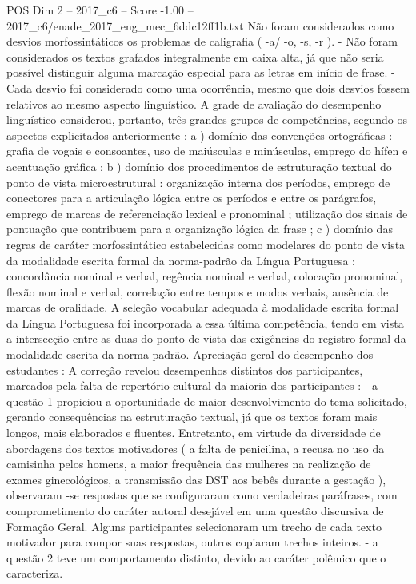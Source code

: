 \begin{textsample}{POS Dim 2 – 2017\_c6 – Score -1.00 – 2017\_c6/enade\_2017\_eng\_mec\_6ddc12ff1b.txt}
Não foram considerados como desvios morfossintáticos os problemas de caligrafia ( -a/ -o, -s, -r ). - Não foram considerados os textos grafados integralmente em caixa alta, já que não seria possível distinguir alguma marcação especial para as letras em início de frase. - Cada desvio foi considerado como uma ocorrência, mesmo que dois desvios fossem relativos ao mesmo aspecto linguístico.
A grade de avaliação do desempenho linguístico considerou, portanto, três grandes grupos de competências, segundo os aspectos explicitados anteriormente : a ) domínio das convenções ortográficas : grafia de vogais e consoantes, uso de maiúsculas e minúsculas, emprego do hífen e acentuação gráfica ; b ) domínio dos procedimentos de estruturação textual do ponto de vista microestrutural : organização interna dos períodos, emprego de conectores para a articulação lógica entre os períodos e entre os parágrafos, emprego de marcas de referenciação lexical e pronominal ; utilização dos sinais de pontuação que contribuem para a organização lógica da frase ; c ) domínio das regras de caráter morfossintático estabelecidas como modelares do ponto de vista da modalidade escrita formal da norma-padrão da Língua Portuguesa : concordância nominal e verbal, regência nominal e verbal, colocação pronominal, flexão nominal e verbal, correlação entre tempos e modos verbais, ausência de marcas de oralidade.
A seleção vocabular adequada à modalidade escrita formal da Língua Portuguesa foi incorporada a essa última competência, tendo em vista a intersecção entre as duas do ponto de vista das exigências do registro formal da modalidade escrita da norma-padrão.
Apreciação geral do desempenho dos estudantes : A correção revelou desempenhos distintos dos participantes, marcados pela falta de repertório cultural da maioria dos participantes : - a questão 1 propiciou a oportunidade de maior desenvolvimento do tema solicitado, gerando consequências na estruturação textual, já que os textos foram mais longos, mais elaborados e fluentes.
Entretanto, em virtude da diversidade de abordagens dos textos motivadores ( a falta de penicilina, a recusa no uso da camisinha pelos homens, a maior frequência das mulheres na realização de exames ginecológicos, a transmissão das DST aos bebês durante a gestação ), observaram -se respostas que se configuraram como verdadeiras paráfrases, com comprometimento do caráter autoral desejável em uma questão discursiva de Formação Geral.
Alguns participantes selecionaram um trecho de cada texto motivador para compor suas respostas, outros copiaram trechos inteiros. - a questão 2 teve um comportamento distinto, devido ao caráter polêmico que o caracteriza.

\end{textsample}
